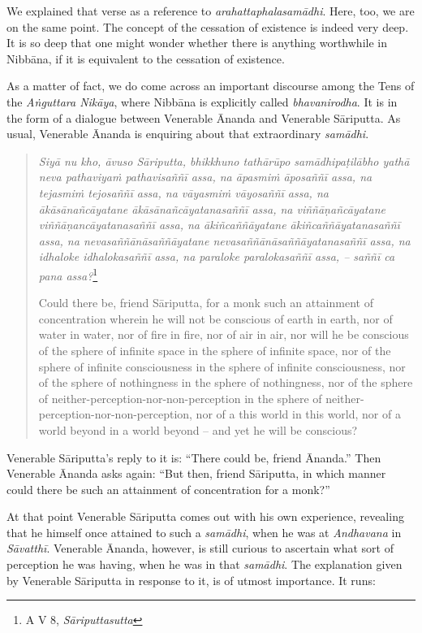 We explained that verse as a reference to \emph{arahattaphalasamādhi}. Here, too, we are on the same point. The concept of the cessation of existence is indeed very deep. It is so deep that one might wonder whether there is anything worthwhile in Nibbāna, if it is equivalent to the cessation of existence.

As a matter of fact, we do come across an important discourse among the Tens of the \emph{Aṅguttara Nikāya}, where Nibbāna is explicitly called \emph{bhavanirodha}. It is in the form of a dialogue between Venerable Ānanda and Venerable Sāriputta. As usual, Venerable Ānanda is enquiring about that extraordinary \emph{samādhi}.

\begin{quote}
\emph{Siyā nu kho, āvuso Sāriputta, bhikkhuno tathārūpo samādhipaṭilābho yathā neva pathaviyaṁ pathavisaññī assa, na āpasmiṁ āposaññī assa, na tejasmiṁ tejosaññī assa, na vāyasmiṁ vāyosaññī assa, na ākāsānañcāyatane ākāsānañcāyatanasaññī assa, na viññāṇañcāyatane viññāṇancāyatanasaññī assa, na ākiñcaññāyatane ākiñcaññāyatanasaññī assa, na nevasaññānāsaññāyatane nevasaññānāsaññāyatanasaññī assa, na idhaloke idhalokasaññī assa, na paraloke paralokasaññī assa, -- saññī ca pana assa?}\footnote{A V 8, \emph{Sāriputtasutta}}

Could there be, friend Sāriputta, for a monk such an attainment of concentration wherein he will not be conscious of earth in earth, nor of water in water, nor of fire in fire, nor of air in air, nor will he be conscious of the sphere of infinite space in the sphere of infinite space, nor of the sphere of infinite consciousness in the sphere of infinite consciousness, nor of the sphere of nothingness in the sphere of nothingness, nor of the sphere of neither-perception-nor-non-perception in the sphere of neither-perception-nor-non-perception, nor of a this world in this world, nor of a world beyond in a world beyond -- and yet he will be conscious?
\end{quote}

Venerable Sāriputta's reply to it is: ``There could be, friend Ānanda.'' Then Venerable Ānanda asks again: ``But then, friend Sāriputta, in which manner could there be such an attainment of concentration for a monk?''

At that point Venerable Sāriputta comes out with his own experience, revealing that he himself once attained to such a \emph{samādhi}, when he was at \emph{Andhavana} in \emph{Sāvatthī}. Venerable Ānanda, however, is still curious to ascertain what sort of perception he was having, when he was in that \emph{samādhi}. The explanation given by Venerable Sāriputta in response to it, is of utmost importance. It runs:

